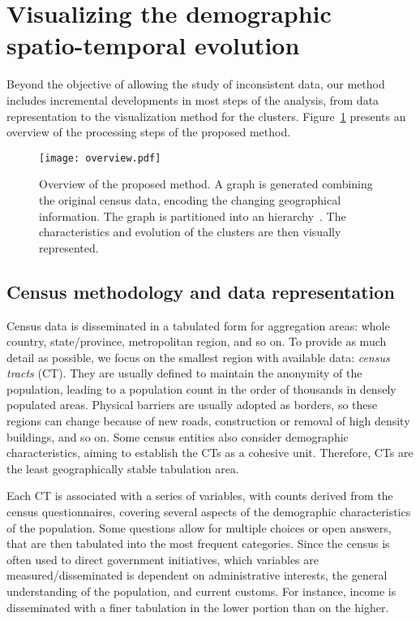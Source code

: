 \section{Visualizing the demographic spatio-temporal evolution}
Beyond the objective of allowing the study of inconsistent data, our method
includes incremental developments in most steps of the analysis, from data
representation to the visualization method for the clusters.
Figure~\ref{fig:overview} presents an overview of the processing steps of the
proposed method.



\begin{figure}
    \centering 
    \texttt{[image: overview.pdf]}
    \caption{Overview of the proposed method. A graph is generated combining the
        original census data, encoding the changing geographical information.
        The graph is partitioned into an hierarchy~\cite{markus2017}. The
        characteristics and evolution of the clusters are then visually
        represented.
        \label{fig:overview}}
\end{figure}


\subsection{Census methodology and data representation}

Census data is disseminated in a tabulated form for aggregation areas: whole
country, state/province, metropolitan region, and so on. To provide as much
detail as possible, we focus on the smallest region with available data:
\emph{census tracts} (CT). They are usually defined to maintain the anonymity of
the population, leading to a population count in the order of thousands in
densely populated areas. Physical barriers are usually adopted as borders, so
these regions can change because of new roads, construction or removal of high
density buildings, and so on. Some census entities also consider demographic
characteristics, aiming to establish the CTs as a cohesive unit. Therefore, CTs
are the least geographically stable tabulation area.


Each CT is associated with a series of variables, with counts derived from the
census questionnaires, covering several aspects of the demographic
characteristics of the population. Some questions allow for multiple choices or
open answers, that are then tabulated into the most frequent categories. Since
the census is often used to direct government initiatives, which variables are
measured/disseminated is dependent on administrative interests, the general
understanding of the population, and current customs. For instance, income is
disseminated with a finer tabulation in the lower portion than on the higher. 


